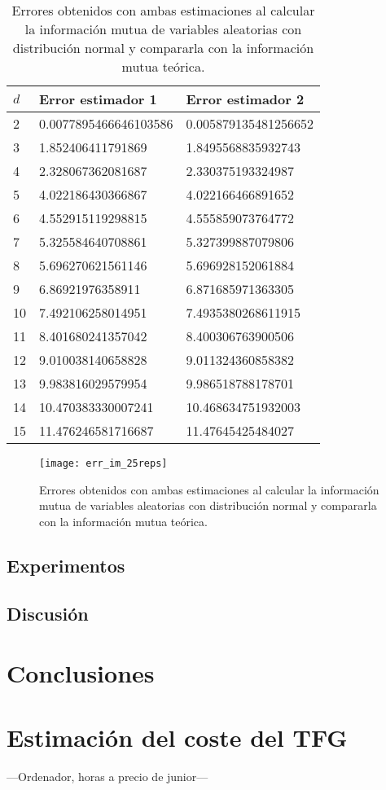 \documentclass[10pt,a4paper]{article} %
\theoremstyle{definition}
\begin{document}
\begin{table}[H]
\centering
\caption{Errores obtenidos con ambas estimaciones al calcular la información mutua de variables aleatorias con distribución normal y compararla con la información mutua teórica.}
\label{tab:err_im}
\begin{tabular}{lll}
\toprule
$d$ & Error estimador 1 & Error estimador 2\\ \midrule
2 & 0.0077895466646103586 & 0.005879135481256652\\
3 & 1.852406411791869 & 1.8495568835932743\\
4 & 2.328067362081687 & 2.330375193324987\\
5 & 4.022186430366867 & 4.022166466891652\\
6 & 4.552915119298815 & 4.555859073764772\\
7 & 5.325584640708861 & 5.327399887079806\\
8 & 5.696270621561146 & 5.696928152061884\\
9 & 6.86921976358911 & 6.871685971363305\\
10 & 7.492106258014951 & 7.4935380268611915\\
11 & 8.401680241357042 & 8.400306763900506\\
12 & 9.010038140658828 & 9.011324360858382\\
13 & 9.983816029579954 & 9.986518788178701\\
14 & 10.470383330007241 & 10.468634751932003\\
15 & 11.476246581716687 & 11.47645425484027\\
\bottomrule
\end{tabular}
\end{table}

\begin{figure}[H]
    \centering
    \texttt{[image: err\_im\_25reps]}
    \caption{Errores obtenidos con ambas estimaciones al calcular la información mutua de variables aleatorias con distribución normal y compararla con la información mutua teórica.}
    \label{fig:err_im}
\end{figure}


\subsection{Experimentos}
\subsection{Discusión}

\section{Conclusiones}

\section{Estimación del coste del TFG}
---Ordenador, horas a precio de junior---

\newpage
\printbibliography
\end{document}
